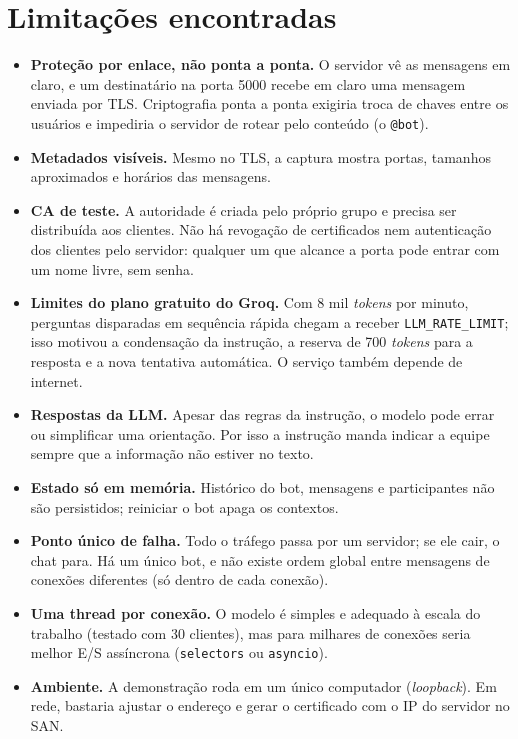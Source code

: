 \documentclass[11pt,a4paper]{article}
\newcommand{\cod}[1]{\texttt{#1}}
\begin{document}
\section{Limitações encontradas}\label{sec:limitacoes}
\begin{itemize}
  \item \textbf{Proteção por enlace, não ponta a ponta.} O servidor vê as mensagens em claro, e um
        destinatário na porta 5000 recebe em claro uma mensagem enviada por TLS. Criptografia ponta a
        ponta exigiria troca de chaves entre os usuários e impediria o servidor de rotear pelo conteúdo
        (o \cod{@bot}).
  \item \textbf{Metadados visíveis.} Mesmo no TLS, a captura mostra portas, tamanhos aproximados e
        horários das mensagens.
  \item \textbf{CA de teste.} A autoridade é criada pelo próprio grupo e precisa ser distribuída aos
        clientes. Não há revogação de certificados nem autenticação dos clientes pelo servidor: qualquer
        um que alcance a porta pode entrar com um nome livre, sem senha.
  \item \textbf{Limites do plano gratuito do Groq.} Com 8 mil \emph{tokens} por minuto, perguntas
        disparadas em sequência rápida chegam a receber \cod{LLM\_RATE\_LIMIT}; isso motivou a
        condensação da instrução, a reserva de 700 \emph{tokens} para a resposta e a nova tentativa
        automática. O serviço também depende de internet.
  \item \textbf{Respostas da LLM.} Apesar das regras da instrução, o modelo pode errar ou simplificar uma
        orientação. Por isso a instrução manda indicar a equipe sempre que a informação não estiver no texto.
  \item \textbf{Estado só em memória.} Histórico do bot, mensagens e participantes não são persistidos;
        reiniciar o bot apaga os contextos.
  \item \textbf{Ponto único de falha.} Todo o tráfego passa por um servidor; se ele cair, o chat para. Há
        um único bot, e não existe ordem global entre mensagens de conexões diferentes (só dentro de cada
        conexão).
  \item \textbf{Uma thread por conexão.} O modelo é simples e adequado à escala do trabalho (testado com
        30 clientes), mas para milhares de conexões seria melhor E/S assíncrona (\cod{selectors} ou
        \cod{asyncio}).
  \item \textbf{Ambiente.} A demonstração roda em um único computador (\emph{loopback}). Em rede, bastaria
        ajustar o endereço e gerar o certificado com o IP do servidor no SAN.
\end{itemize}
\end{document}
